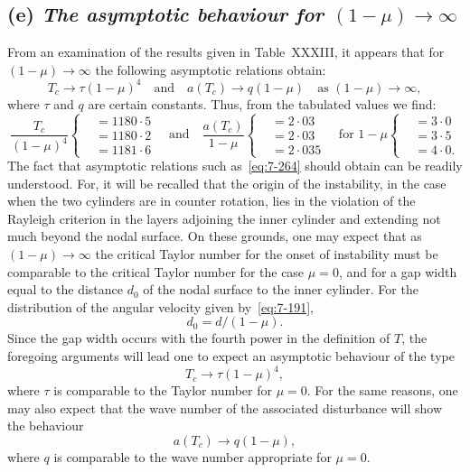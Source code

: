 \subsection*{(e) \emph{The asymptotic behaviour for $(1-\mu) \to \infty$}}
From an examination of the results given in Table~XXXIII, it appears
that for $(1-\mu) \to \infty$ the following asymptotic relations obtain:
\begin{equation}
\label{eq:7-264}
T_c \to \tau(1-\mu)^4 \quad \text{and} \quad
a(T_c) \to q(1-\mu) \quad \text{as } (1-\mu) \to \infty,
\end{equation}
where $\tau$ and $q$ are certain constants.  Thus, from the tabulated values
we find:
\begin{equation}
\label{eq:7-265}
\frac{T_c}{(1-\mu)^4}\left\{
\begin{aligned}
&= 1180{\cdot}5\\
&= 1180{\cdot}2\\
&= 1181{\cdot}6
\end{aligned}
\right.
\quad \text{and} \quad
\frac{a(T_c)}{1-\mu}\left\{
\begin{aligned}
&= 2{\cdot}03\\
&= 2{\cdot}03\\
&= 2{\cdot}035
\end{aligned}
\right.
\quad \text{for } 1-\mu\left\{
\begin{aligned}
&= 3{\cdot}0\\
&= 3{\cdot}5\\
&= 4{\cdot}0.
\end{aligned}
\right.
\end{equation}
The fact that asymptotic relations such as~\eqref{eq:7-264} should obtain can be
readily understood.  For, it will be recalled that the origin of the instability, in the case when the two cylinders are in counter rotation, lies
in the violation of the Rayleigh criterion in the layers adjoining the inner
cylinder and extending not much beyond the nodal surface.  On these
grounds, one may expect that as $(1-\mu) \to \infty$ the critical Taylor
number for the onset of instability must be comparable to the critical Taylor
number for the case $\mu = 0$, and for a gap width equal to the distance
$d_0$ of the nodal surface to the inner cylinder.  For the distribution of the
angular velocity given by~\eqref{eq:7-191},
\begin{equation}
\label{eq:7-266}
d_0 = d/(1-\mu).
\end{equation}
Since the gap width occurs with the fourth power in the definition of $T$,
the foregoing arguments will lead one to expect an asymptotic behaviour
of the type
\begin{equation}
\label{eq:7-267}
T_c \to \tau(1-\mu)^4,
\end{equation}
where $\tau$ is comparable to the Taylor number for $\mu = 0$.  For the same
reasons, one may also expect that the wave number of the associated
disturbance will show the behaviour
\begin{equation}
\label{eq:7-268}
a(T_c) \to q(1-\mu),
\end{equation}
where $q$ is comparable to the wave number appropriate for $\mu = 0$.

